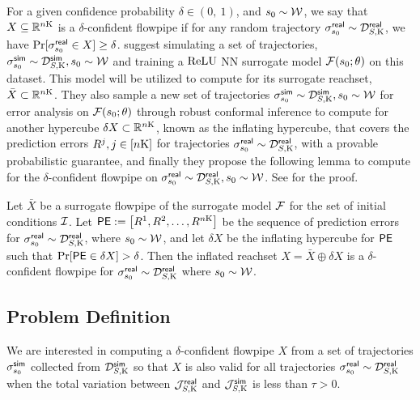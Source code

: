  For a given confidence probability $\delta\in (0,\ 1)$, and $s_0 \sim \mathcal{W}$, we say that $X \subseteq \mathbb{R}^{n\mathrm{K}}$ is a $\delta$-confident flowpipe if for any random trajectory $\sigma^{\mathsf{real}}_{s_0} \sim \mathcal{D}_{S,\mathrm{K}}^{\mathsf{real}}$, we have $\Pr[\sigma^{\mathsf{real}}_{s_0} \in X ] \geq \delta$.  suggest simulating a set of trajectories, $\sigma^{\mathsf{sim}}_{s_0} \sim \mathcal{D}_{S,\mathrm{K}}^{\mathsf{sim}}, s_0 \sim \mathcal{W}$ and training a $\mathrm{ReLU}$ NN surrogate model $\mathcal{F}(s_0 ; \theta)$ on this dataset. This model will be utilized to compute for its surrogate reachset, $\bar{X}\subset \mathbb{R}^{n\mathrm{K}}$. They also sample a new set of trajectories $\sigma^{\mathsf{sim}}_{s_0} \sim \mathcal{D}_{S,\mathrm{K}}^{\mathsf{sim}}, s_0 \sim \mathcal{W}$ for error analysis on $\mathcal{F}(s_0 ; \theta)$ through robust conformal inference to compute for another hypercube $\delta X \subset \mathbb{R}^{n\mathrm{K}}$, known as the inflating hypercube, that covers the prediction errors $R^j , j\in[n\mathrm{K}]$ for trajectories $\sigma^{\mathsf{real}}_{s_0} \sim \mathcal{D}_{S,\mathrm{K}}^{\mathsf{real}}$, with a provable probabilistic guarantee, and finally they propose the following lemma to compute for the $\delta$-confident flowpipe on $\sigma^{\mathsf{real}}_{s_0} \sim \mathcal{D}_{S,\mathrm{K}}^{\mathsf{real}}, s_0 \sim \mathcal{W}$. See \cite{hashemi2024statistical} for the proof.
\begin{lemma}\label{lem:inclusion_conformal}
Let $\bar{X}$ be a surrogate flowpipe of the surrogate model $\mathcal{F}$ for the set of initial conditions $\mathcal{I}$. Let $\mathsf{PE}:=\left[ R^{1} , R^{2}, \ldots , R^{n\mathrm{K}} \right] $ be the sequence of prediction errors for $\sigma^{\mathsf{real}}_{s_0} \sim \mathcal{D}_{S,\mathrm{K}}^{\mathsf{real}}$, where $s_0 \sim \mathcal{W}$, and  let $\delta X$ be the inflating hypercube for $\mathsf{PE}$ such that $\Pr[\mathsf{PE} \in \delta X] > \delta$. Then the inflated reachset $X = \bar{X} \oplus \delta X $ is a $\delta$-confident flowpipe for $\sigma^{\mathsf{real}}_{s_0} \sim \mathcal{D}_{S,\mathrm{K}}^{\mathsf{real}}$ where $s_0 \sim \mathcal{W}$.
\end{lemma}

\vspace{-2mm}
\subsection{Problem Definition}
\vspace{-2mm}
We are interested in computing  a $\delta$-confident flowpipe $X$ from a set of trajectories $\sigma^{\mathsf{sim}}_{s_0}$ collected from $ \mathcal{D}_{S,\mathrm{K}}^{\mathsf{sim}}$ so that $X$ is also valid  for all trajectories $\sigma^{\mathsf{real}}_{s_0} \sim \mathcal{D}_{S,\mathrm{K}}^{\mathsf{real}}$ when the total variation between $\mathcal{J}_{S,\mathrm{K}}^{\mathsf{real}}$ and $\mathcal{J}_{S,\mathrm{K}}^{\mathsf{sim}}$ is less than $\tau>0$. 


